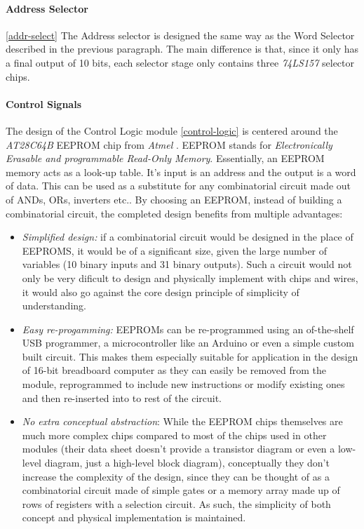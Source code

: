 

\paragraph{Address Selector} \ref{addr-select}
The Address selector is designed the same way as the Word Selector described in the previous
paragraph. The main difference is that, since it only has a final output of 10 bits,
each selector stage only contains three \emph{74LS157} \cite{74ls157} selector chips.



\paragraph{Control Signals}
The design of the Control Logic module \ref{control-logic} is centered around the \emph{AT28C64B}
EEPROM chip from \emph{Atmel} \cite{at28c64b}. EEPROM stands for \emph{Electronically Erasable
and programmable Read-Only Memory}. Essentially, an EEPROM memory acts as a look-up table.
It's input is an address and the output is a word of data. This can be used as a substitute
for any combinatorial circuit made out of ANDs, ORs, inverters etc.. By choosing an EEPROM,
instead of building a combinatorial circuit, the completed design benefits from multiple
advantages:
\begin{itemize}
  \item \emph{Simplified design:} if a combinatorial circuit would be designed in the place of
  EEPROMS, it would be of a significant size, given the large number of variables (10 binary
  inputs and 31 binary outputs). Such a circuit would not only be very dificult to design and
  physically implement with chips and wires, it would also go against the core design principle
  of simplicity of understanding.
  \item \emph{Easy re-progamming:} EEPROMs can be re-programmed using an of-the-shelf USB
  programmer, a microcontroller like an Arduino \cite{arduino2020mega} or even a simple custom
  built circuit. This makes them especially suitable for application in the design of 16-bit
  breadboard computer as they can easily be removed from the module, reprogrammed to include
  new instructions or modify existing ones and then re-inserted into to rest of the circuit.
  \item \emph{No extra conceptual abstraction}: While the EEPROM chips themselves are much more
  complex chips compared to most of the chips used in other modules (their data sheet doesn't
  provide a transistor diagram or even a low-level diagram, just a high-level block diagram),
  conceptually they don't increase the complexity of the design, since they can be thought of
  as a combinatorial circuit made of simple gates or a memory array made up of rows of registers
  with a selection circuit. As such, the simplicity of both concept and physical implementation
  is maintained.
\end{itemize}

